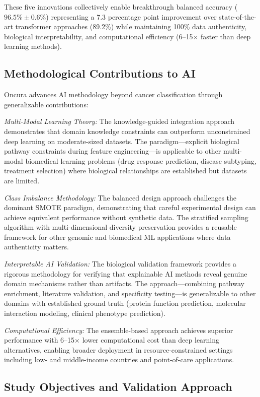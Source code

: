 \documentclass[manuscript, screen, review]{jair}
\begin{document}
These five innovations collectively enable breakthrough balanced accuracy ($96.5\% \pm 0.6\%$) representing a 7.3 percentage point improvement over state-of-the-art transformer approaches (89.2\%) while maintaining 100\% data authenticity, biological interpretability, and computational efficiency (6--15$\times$ faster than deep learning methods).

\subsection{Methodological Contributions to AI}

Oncura advances AI methodology beyond cancer classification through generalizable contributions:

\emph{Multi-Modal Learning Theory:} The knowledge-guided integration approach demonstrates that domain knowledge constraints can outperform unconstrained deep learning on moderate-sized datasets. The paradigm---explicit biological pathway constraints during feature engineering---is applicable to other multi-modal biomedical learning problems (drug response prediction, disease subtyping, treatment selection) where biological relationships are established but datasets are limited.

\emph{Class Imbalance Methodology:} The balanced design approach challenges the dominant SMOTE paradigm, demonstrating that careful experimental design can achieve equivalent performance without synthetic data. The stratified sampling algorithm with multi-dimensional diversity preservation provides a reusable framework for other genomic and biomedical ML applications where data authenticity matters.

\emph{Interpretable AI Validation:} The biological validation framework provides a rigorous methodology for verifying that explainable AI methods reveal genuine domain mechanisms rather than artifacts. The approach---combining pathway enrichment, literature validation, and specificity testing---is generalizable to other domains with established ground truth (protein function prediction, molecular interaction modeling, clinical phenotype prediction).

\emph{Computational Efficiency:} The ensemble-based approach achieves superior performance with 6--15$\times$ lower computational cost than deep learning alternatives, enabling broader deployment in resource-constrained settings including low- and middle-income countries and point-of-care applications.

\subsection{Study Objectives and Validation Approach}
\end{document}
